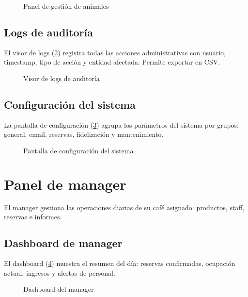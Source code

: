 \documentclass[12pt,a4paper,twoside,openright]{report}
\begin{document}
\begin{figure}[H]
  \centering
  \fbox{\rule{0pt}{6cm}\rule{12cm}{0pt}}
  \caption{Panel de gestión de animales}
  \label{fig:35-admin-animales}
\end{figure}

\subsection{Logs de auditoría}
El visor de logs (\cref{fig:41-admin-logs-auditoria}) registra todas las acciones
administrativas con usuario, timestamp, tipo de acción y entidad afectada.
Permite exportar en CSV.

\begin{figure}[H]
  \centering
  \fbox{\rule{0pt}{6cm}\rule{12cm}{0pt}}
  \caption{Visor de logs de auditoría}
  \label{fig:41-admin-logs-auditoria}
\end{figure}

\subsection{Configuración del sistema}
La pantalla de configuración (\cref{fig:40-admin-settings}) agrupa los parámetros
del sistema por grupos: general, email, reservas, fidelización y mantenimiento.

\begin{figure}[H]
  \centering
  \fbox{\rule{0pt}{6cm}\rule{12cm}{0pt}}
  \caption{Pantalla de configuración del sistema}
  \label{fig:40-admin-settings}
\end{figure}

\section{Panel de manager}
\label{sec:manual-manager}

El manager gestiona las operaciones diarias de su café asignado: productos,
staff, reservas e informes.

\subsection{Dashboard de manager}
El dashboard (\cref{fig:49-manager-dashboard}) muestra el resumen del día:
reservas confirmadas, ocupación actual, ingresos y alertas de personal.

\begin{figure}[H]
  \centering
  \fbox{\rule{0pt}{6cm}\rule{12cm}{0pt}}
  \caption{Dashboard del manager}
  \label{fig:49-manager-dashboard}
\end{figure}
\end{document}

